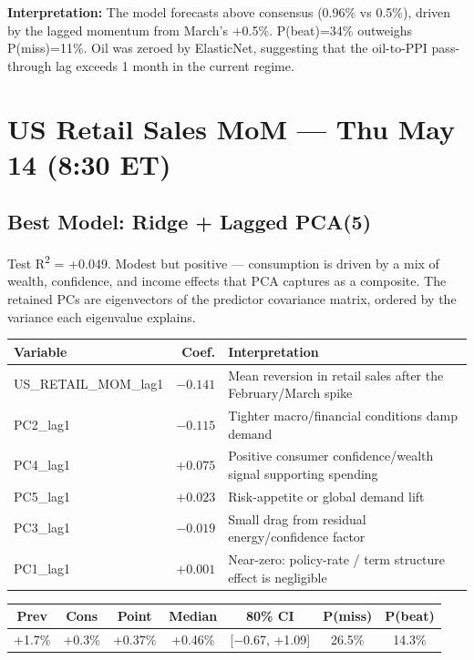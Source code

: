 \documentclass[11pt,a4paper]{article}
\begin{document}
\noindent\textbf{Interpretation:} The model forecasts above consensus (0.96\% vs 0.5\%), driven by the lagged momentum from March's +0.5\%. P(beat)=34\% outweighs P(miss)=11\%. Oil was zeroed by ElasticNet, suggesting that the oil-to-PPI pass-through lag exceeds 1 month in the current regime.

\vspace{0.5cm}
\section*{US Retail Sales MoM --- Thu May 14 (8:30 ET)}

\subsection*{Best Model: Ridge + Lagged PCA(5)}
Test R\textsuperscript{2} = +0.049. Modest but positive --- consumption is driven by a mix of wealth, confidence, and income effects that PCA captures as a composite. The retained PCs are eigenvectors of the predictor covariance matrix, ordered by the variance each eigenvalue explains.

\begin{table}[H]
\centering\small
\begin{tabular}{lrl}
\toprule
\textbf{Variable} & \textbf{Coef.} & \textbf{Interpretation} \\
\midrule
US\_RETAIL\_MOM\_lag1 & $-0.141$ & Mean reversion in retail sales after the February/March spike \\
PC2\_lag1 & $-0.115$ & Tighter macro/financial conditions damp demand \\
PC4\_lag1 & $+0.075$ & Positive consumer confidence/wealth signal supporting spending \\
PC5\_lag1 & $+0.023$ & Risk-appetite or global demand lift \\
PC3\_lag1 & $-0.019$ & Small drag from residual energy/confidence factor \\
PC1\_lag1 & $+0.001$ & Near-zero: policy-rate / term structure effect is negligible \\
\bottomrule
\end{tabular}
\end{table}

\begin{table}[H]
\centering\small
\begin{tabular}{ccccccc}
\toprule
\textbf{Prev} & \textbf{Cons} & \textbf{Point} & \textbf{Median} & \textbf{80\% CI} & \textbf{P(miss)} & \textbf{P(beat)} \\
\midrule
+1.7\% & +0.3\% & +0.37\% & +0.46\% & [$-$0.67, +1.09] & 26.5\% & 14.3\% \\
\bottomrule
\end{tabular}
\end{table}
\end{document}
